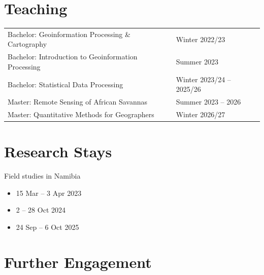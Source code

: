 \documentclass[10pt]{article} %
\begin{document}
\vspace{6mm}
\section{Teaching}

\begin{tabular}{@{}>{\raggedright}p{10cm} l}
Bachelor: Geoinformation Processing \& Cartography & Winter 2022/23\\
[0.2cm]
Bachelor: Introduction to Geoinformation Processing & Summer 2023\\
[0.2cm]
Bachelor: Statistical Data Processing & Winter 2023/24 -- 2025/26\\
[0.2cm]
Master: Remote Sensing of African Savannas & Summer 2023 -- 2026\\
[0.2cm]
Master: Quantitative Methods for Geographers & Winter 2026/27\\
\end{tabular}


\vspace{6mm}
\section{Research Stays}

Field studies in Namibia

\begin{itemize}[leftmargin=0.3cm]
\item 15 Mar -- 3 Apr 2023
\item 2 -- 28 Oct 2024
\item 24 Sep -- 6 Oct 2025
\end{itemize}


\vspace{6mm}
\section{Further Engagement}
\end{document}
